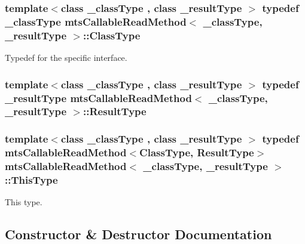 \subsubsection[{Class\+Type}]{\setlength{\rightskip}{0pt plus 5cm}template$<$class \+\_\+class\+Type , class \+\_\+result\+Type $>$ typedef \+\_\+class\+Type {\bf mts\+Callable\+Read\+Method}$<$ \+\_\+class\+Type, \+\_\+result\+Type $>$\+::{\bf Class\+Type}}\label{classmts_callable_read_method_a44650138085a29d60a4f3cb3616abbbf}
Typedef for the specific interface. \hypertarget{classmts_callable_read_method_ae1add51b4fb434797e00a79fe31aa7de}{}
\subsubsection[{Result\+Type}]{\setlength{\rightskip}{0pt plus 5cm}template$<$class \+\_\+class\+Type , class \+\_\+result\+Type $>$ typedef \+\_\+result\+Type {\bf mts\+Callable\+Read\+Method}$<$ \+\_\+class\+Type, \+\_\+result\+Type $>$\+::{\bf Result\+Type}}\label{classmts_callable_read_method_ae1add51b4fb434797e00a79fe31aa7de}
\hypertarget{classmts_callable_read_method_af176b353a29900c0d650356c559c4cdd}{}
\subsubsection[{This\+Type}]{\setlength{\rightskip}{0pt plus 5cm}template$<$class \+\_\+class\+Type , class \+\_\+result\+Type $>$ typedef {\bf mts\+Callable\+Read\+Method}$<${\bf Class\+Type}, {\bf Result\+Type}$>$ {\bf mts\+Callable\+Read\+Method}$<$ \+\_\+class\+Type, \+\_\+result\+Type $>$\+::{\bf This\+Type}}\label{classmts_callable_read_method_af176b353a29900c0d650356c559c4cdd}
This type. 

\subsection{Constructor \& Destructor Documentation}
\hypertarget{classmts_callable_read_method_aaf583c2ff199486fe6691a1b50e0b67f}{}

